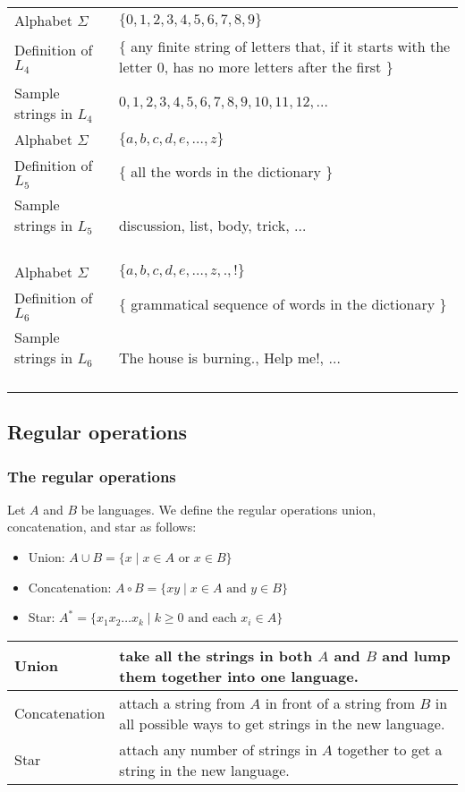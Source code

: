 \documentclass[xcolor=table]{beamer}
\begin{document}
\begin{frame}

  \begin{tabular}{lp{2.5in}}
  Alphabet $\Sigma$ &   $\{ 0,1,2,3,4,5,6,7,8,9 \}$ \\
  Definition of $L_4$ &   $\{$ any finite string of letters that, if it
  starts with the letter $0$, has no more letters after the first $\}$ \\
  Sample strings in $L_4$ & $0,1,2,3,4,5,6,7,8,9,10,11,12,\ldots$
  \\[1ex] \hline
  Alphabet $\Sigma$ &   $\{ a,b,c,d,e,\ldots,z \}$\\
  Definition of $L_5$ &   $\{$ all the words in the dictionary $\}$ \\
  Sample strings in $L_5$ \ \ \  & discussion, list, body, trick,
  $\ldots$ \\[1ex] \hline
  Alphabet $\Sigma$ &   $\{ a,b,c,d,e,\ldots,z, ., ! \}$\\
  Definition of $L_6$ &   $\{$ grammatical sequence of words in the dictionary $\}$ \\
  Sample strings in $L_6$ \ \ \  & The house is burning., Help me!, $\ldots$ 
  \end{tabular}
\end{frame}



\subsection[regular operations]{Regular operations}

\begin{frame}
  \frametitle{The regular operations}

  \begin{Definition}
    Let $A$ and $B$ be
      languages. We define the regular operations {union},
      {concatenation}, and {star} as follows:
      \begin{itemize}
	\item \alert{Union}: $A\cup B = \{ x \; | \; x \in A \mbox{ or } x \in B \}$
	\item \alert{Concatenation}: $A \circ B = \{ xy \; | \; x \in A \mbox{ and } y \in B \}$
	\item \alert{Star}: $A^* =\{ x_1 x_2\ldots x_k \; | \; k \geq 0 \mbox{ and each } x_i \in A \}$
      \end{itemize}
  \end{Definition}
  
  \begin{tabular}{lp{3in}}
    Union & take all the strings in both $A$ and $B$ and lump them together into one language. \\ \hline
    Concatenation & attach a string from $A$ in front of a string from $B$ in all possible ways to get strings in the new language. \\ \hline
    Star & attach any number of strings in $A$ together to get a string in the new language.
  \end{tabular}

\end{frame}
\end{document}
